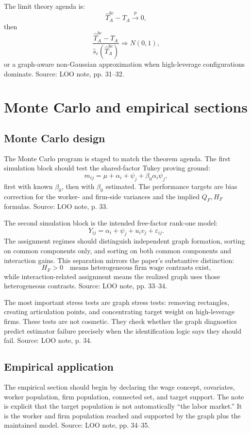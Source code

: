 \documentclass[11pt]{article}
\begin{document}
The limit theory agenda is:
\[
\hat T_A^{bc}-T_A\overset{p}{\to}0,
\]
then
\[
\frac{\hat T_A^{bc}-T_A}{\hat s_e(\hat T_A^{bc})}
\Rightarrow N(0,1),
\]
or a graph-aware non-Gaussian approximation when high-leverage configurations
dominate. Source: LOO note, pp. 31--32.

\section{Monte Carlo and empirical sections}

\subsection{Monte Carlo design}

The Monte Carlo program is staged to match the theorem agenda. The first
simulation block should test the shared-factor Tukey proving ground:
\[
m_{ij}=\mu+\alpha_i+\psi_j+\beta_0\alpha_i\psi_j,
\]
first with known \(\beta_0\), then with \(\beta_0\) estimated. The performance
targets are bias correction for the worker- and firm-side variances and the
implied \(Q_F,H_F\) formulas. Source: LOO note, p. 33.

The second simulation block is the intended free-factor rank-one model:
\[
Y_{ij}=\alpha_i+\psi_j+u_i v_j+\varepsilon_{ij}.
\]
The assignment regimes should distinguish independent graph formation, sorting
on common components only, and sorting on both common components and interaction
gains. This separation mirrors the paper's substantive distinction:
\[
H_F>0
\quad\text{means heterogeneous firm wage contrasts exist,}
\]
while interaction-related assignment means the realized graph uses those
heterogeneous contrasts. Source: LOO note, pp. 33--34.

The most important stress tests are graph stress tests: removing rectangles,
creating articulation points, and concentrating target weight on high-leverage
firms. These tests are not cosmetic. They check whether the graph diagnostics
predict estimator failure precisely when the identification logic says they
should fail. Source: LOO note, p. 34.

\subsection{Empirical application}

The empirical section should begin by declaring the wage concept, covariates,
worker population, firm population, connected set, and target support. The note
is explicit that the target population is not automatically ``the labor
market.'' It is the worker and firm population reached and supported by the
graph plus the maintained model. Source: LOO note, pp. 34--35.
\end{document}
